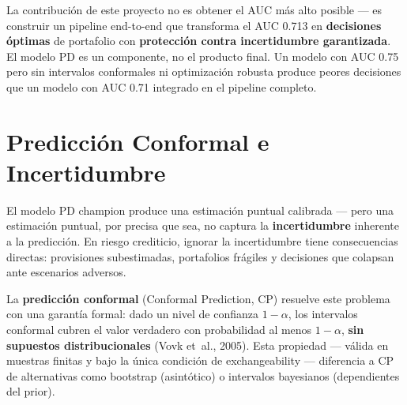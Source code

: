 \documentclass[
  spanish,
  11pt,
  letterpaper,
]{scrbook}
\theoremstyle{plain}
\theoremstyle{remark}
\begin{document}
\begin{tcolorbox}[enhanced jigsaw, arc=.35mm, bottomrule=.15mm, bottomtitle=1mm, breakable, colback=white, colbacktitle=quarto-callout-tip-color!10!white, colframe=quarto-callout-tip-color-frame, coltitle=black, left=2mm, leftrule=.75mm, opacityback=0, opacitybacktitle=0.6, rightrule=.15mm, title=\textcolor{quarto-callout-tip-color}{\faLightbulb}\hspace{0.5em}{Más allá del AUC}, titlerule=0mm, toprule=.15mm, toptitle=1mm]

La contribución de este proyecto no es obtener el AUC más alto posible
--- es construir un pipeline end-to-end que transforma el AUC 0.713 en
\textbf{decisiones óptimas} de portafolio con \textbf{protección contra
incertidumbre garantizada}. El modelo PD es un componente, no el
producto final. Un modelo con AUC 0.75 pero sin intervalos conformales
ni optimización robusta produce peores decisiones que un modelo con AUC
0.71 integrado en el pipeline completo.

\end{tcolorbox}

\chapter{Predicción Conformal e
Incertidumbre}\label{predicciuxf3n-conformal-e-incertidumbre}

El modelo PD champion produce una estimación puntual calibrada --- pero
una estimación puntual, por precisa que sea, no captura la
\textbf{incertidumbre} inherente a la predicción. En riesgo crediticio,
ignorar la incertidumbre tiene consecuencias directas: provisiones
subestimadas, portafolios frágiles y decisiones que colapsan ante
escenarios adversos.

La \textbf{predicción conformal} (Conformal Prediction, CP) resuelve
este problema con una garantía formal: dado un nivel de confianza
\(1-\alpha\), los intervalos conformal cubren el valor verdadero con
probabilidad al menos \(1-\alpha\), \textbf{sin supuestos
distribucionales} (Vovk et~al., 2005). Esta propiedad --- válida en
muestras finitas y bajo la única condición de exchangeability ---
diferencia a CP de alternativas como bootstrap (asintótico) o intervalos
bayesianos (dependientes del prior).
\end{document}
